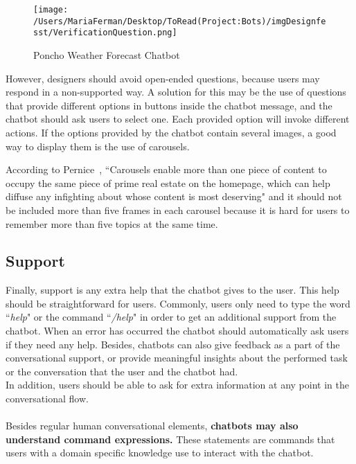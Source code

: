 \documentclass[a4paper,10pt]{article}
\begin{document}

\begin{figure}
\centering
\texttt{[image: /Users/MariaFerman/Desktop/ToRead(Project:Bots)/imgDesignfesst/VerificationQuestion.png]}
\caption{Poncho Weather Forecast Chatbot}
\label{FigureVerificationQuestion}
\end{figure}

However, designers should avoid open-ended questions, because users may respond in a non-supported way. A solution for this may be the use of questions that provide different options in buttons inside the chatbot message, and the chatbot should ask users to select one. Each provided option will invoke different actions. If the options provided by the chatbot contain several images, a good way to display them is the use of carousels. 

According to Pernice~\cite{carousel}, ``Carousels enable more than one piece of content to occupy the same piece of prime real estate on the homepage, which can help diffuse any infighting about whose content is most deserving" and it should not be included more than five frames in each carousel because it is hard for users to remember more than five topics at the same time. 


\subsection{Support}
Finally, support is any extra help that the chatbot gives to the user. This help should be straightforward for users. Commonly, users only need to type the word ``\textit{help}" or the command ``\textit{/help}" in order to get an additional support from the chatbot. When an error has occurred the chatbot should automatically ask users if they need any help. Besides, chatbots can also give feedback as a part of the conversational support, or provide meaningful insights about the performed task or the conversation that the user and the chatbot had.\\[0\baselineskip] In addition, users should be able to ask for extra information at any point in the conversational flow.
\\
\\
Besides regular human conversational elements, \textbf{chatbots may also understand command expressions.} These statements are commands that users with a domain specific knowledge use to interact with the chatbot.
\end{document}
